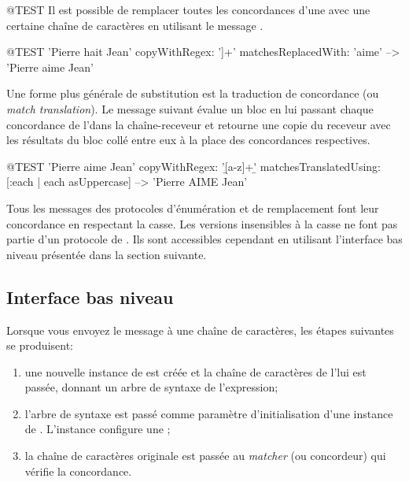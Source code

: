 \documentclass[a4paper,10pt,twoside]{book}
\begin{document}
\begin{code}{@TEST}
Il est possible de remplacer toutes les concordances d'une \expreg
avec une certaine chaîne de caractères en utilisant le message  .

\begin{code}{@TEST}
'Pierre hait Jean' copyWithRegex: '\<[[:lower:]]+\>' matchesReplacedWith: 'aime' -->  'Pierre aime Jean'
\end{code}

Une forme plus générale de substitution est la traduction de
concordance (ou \emph{match translation}). Le message suivant évalue
un bloc en lui passant chaque concordance de l'\expreg dans la
chaîne-receveur et retourne une copie du receveur avec les résultats
du bloc collé entre eux à la place des concordances respectives.

\begin{code}{@TEST}
'Pierre aime Jean' copyWithRegex: '\b[a-z]+\b' matchesTranslatedUsing: [:each | each asUppercase] --> 'Pierre AIME Jean'
\end{code}

Tous les messages des protocoles d'énumération et de remplacement font
leur concordance en respectant la casse. Les versions insensibles à la
casse ne font pas partie d'un protocole de .
Ils sont accessibles cependant en utilisant l'interface bas niveau
présentée dans la section suivante.
\subsection{Interface bas niveau}

Lorsque vous envoyez le message  à une
chaîne de caractères, les étapes suivantes se produisent:

\begin{enumerate}
\item une nouvelle instance de  est créée et la
  chaîne de caractères de l'\expreg lui est passée, donnant un arbre
  de syntaxe de l'expression;
\item  l'arbre de syntaxe est passé comme paramètre d'initialisation
  d'une instance de . L'instance configure une
  ;
\item la chaîne de caractères originale est passée au \emph{matcher}
  (ou concordeur)
  qui vérifie la concordance.
\end{enumerate}


\end{code}
\end{document}
